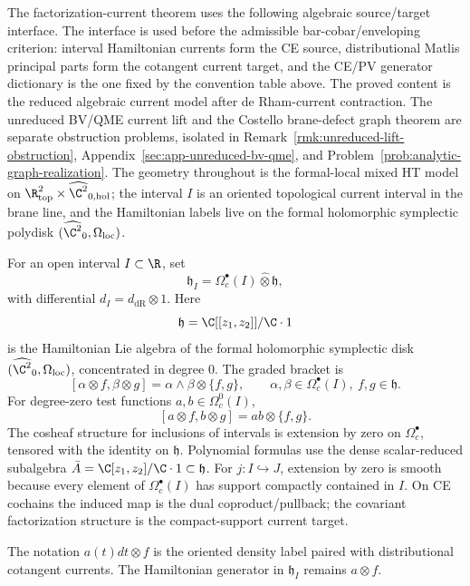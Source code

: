 \medskip
The factorization-current theorem uses the following algebraic
source/target interface.  The interface is used before the admissible
bar-cobar/enveloping criterion: interval Hamiltonian currents form the
CE source, distributional Matlis principal parts form the cotangent
current target, and the CE/PV generator dictionary is the one fixed by
the convention table above.  The proved content is the reduced
algebraic current model after de Rham-current contraction.  The
unreduced BV/QME current lift and the Costello brane-defect graph
theorem are separate obstruction problems, isolated in
Remark~\ref{rmk:unreduced-lift-obstruction},
Appendix~\ref{sec:app-unreduced-bv-qme}, and
Problem~\ref{prob:analytic-graph-realization}.  The geometry throughout
is the formal-local mixed HT model on
\(\R^2_{\mathrm{top}}\times\widehat{\C^2}_{0,\mathrm{hol}}\); the
interval \(I\) is an oriented topological current interval in the brane
line, and the Hamiltonian labels live on the formal holomorphic
symplectic polydisk \((\widehat{\C^2}_0,\Omega_{\mathrm{loc}})\).

\begin{defn}
\label{def:app-factorization-current-source}
  For an open interval \(I\subset\R\), set
  \[
    \mathfrak h_I
      =\Omega^\bullet_c(I)\widehat\otimes\mathfrak h ,
  \]
  with differential \(d_I=d_{\mathrm{dR}}\otimes1\).  Here
  \[
    \mathfrak h=\C[[z_1,z_2]]/\C\cdot1
  \]
  is the Hamiltonian Lie algebra of the formal holomorphic symplectic
  disk \((\widehat{\C^2}_0,\Omega_{\mathrm{loc}})\), concentrated in
  degree \(0\).  The graded bracket is
  \[
    [\alpha\otimes f,\beta\otimes g]
      =\alpha\wedge\beta\otimes\{f,g\},
      \qquad
      \alpha,\beta\in\Omega^\bullet_c(I),\ f,g\in\mathfrak h .
  \]
  For degree-zero test functions \(a,b\in\Omega^0_c(I)\),
  \[
    [a\otimes f,b\otimes g]=ab\otimes\{f,g\}.
  \]
  The cosheaf structure for inclusions of intervals is extension by
  zero on \(\Omega^\bullet_c\), tensored with the identity on
  \(\mathfrak h\).  Polynomial formulas use the dense scalar-reduced
  subalgebra \(\bar A=\C[z_1,z_2]/\C\cdot1\subset\mathfrak h\).
  For \(j:I\hookrightarrow J\), extension by zero is smooth because
  every element of \(\Omega_c^\bullet(I)\) has support compactly
  contained in \(I\).  On CE cochains the induced map is the dual
  coproduct/pullback; the covariant factorization structure is the
  compact-support current target.

  The notation \(a(t)dt\otimes f\) is the oriented density label paired
  with distributional cotangent currents.  The Hamiltonian generator in
  \(\mathfrak h_I\) remains \(a\otimes f\).
\end{defn}

